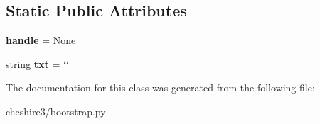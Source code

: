 \subsection*{Static Public Attributes}
\begin{DoxyCompactItemize}
\item 
\hypertarget{classcheshire3_1_1bootstrap_1_1_bootstrap_document_a36f0dfe7ecd377456c5522ad9ea1e4ed}{{\bfseries handle} = None}\label{classcheshire3_1_1bootstrap_1_1_bootstrap_document_a36f0dfe7ecd377456c5522ad9ea1e4ed}

\item 
\hypertarget{classcheshire3_1_1bootstrap_1_1_bootstrap_document_a044b05ad7ae32f6c7bb45f54bee0789d}{string {\bfseries txt} = \char`\"{}\char`\"{}}\label{classcheshire3_1_1bootstrap_1_1_bootstrap_document_a044b05ad7ae32f6c7bb45f54bee0789d}

\end{DoxyCompactItemize}


The documentation for this class was generated from the following file\-:\begin{DoxyCompactItemize}
\item 
cheshire3/bootstrap.\-py\end{DoxyCompactItemize}
